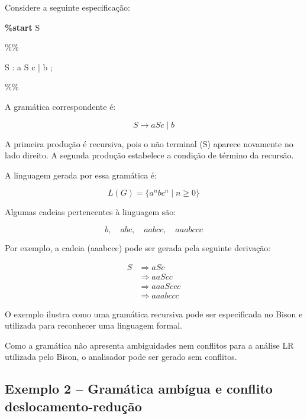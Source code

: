 \documentclass[
  brazilian,
  letterpaper,
]{book}
\newenvironment{Shaded}{\begin{snugshade}}{\end{snugshade}}
\newcommand{\BaseNTok}[1]{\textcolor[rgb]{0.68,0.00,0.00}{#1}}
\newcommand{\CharTok}[1]{\textcolor[rgb]{0.13,0.47,0.30}{#1}}
\newcommand{\KeywordTok}[1]{\textcolor[rgb]{0.00,0.23,0.31}{\textbf{#1}}}
\newcommand{\NormalTok}[1]{\textcolor[rgb]{0.00,0.23,0.31}{#1}}
\newcommand{\StringTok}[1]{\textcolor[rgb]{0.13,0.47,0.30}{#1}}
\theoremstyle{plain}
\theoremstyle{definition}
\theoremstyle{remark}
\begin{document}
Considere a seguinte especificação:

\begin{Shaded}
\begin{Highlighting}[]
\KeywordTok{\%start}\NormalTok{ S}

\BaseNTok{\%\%}

\StringTok{S }\NormalTok{: }\CharTok{\textquotesingle{}a\textquotesingle{}}\NormalTok{ S }\CharTok{\textquotesingle{}c\textquotesingle{}}
\NormalTok{  | }\CharTok{\textquotesingle{}b\textquotesingle{}}
\NormalTok{  ;}

\BaseNTok{\%\%}
\end{Highlighting}
\end{Shaded}

A gramática correspondente é:

\[
S\rightarrow aSc \mid b
\]

A primeira produção é recursiva, pois o não terminal (S) aparece
novamente no lado direito. A segunda produção estabelece a condição de
término da recursão.

A linguagem gerada por essa gramática é:

\[
L(G)=\{a^n b c^n \mid n\geq 0\}
\]

Algumas cadeias pertencentes à linguagem são:

\[
b,\quad abc,\quad aabcc,\quad aaabccc
\]

Por exemplo, a cadeia (aaabccc) pode ser gerada pela seguinte derivação:

\[
\begin{aligned}
S &\Rightarrow aSc\\
  &\Rightarrow aaScc\\
  &\Rightarrow aaaSccc\\
  &\Rightarrow aaabccc
\end{aligned}
\]

O exemplo ilustra como uma gramática recursiva pode ser especificada no
Bison e utilizada para reconhecer uma linguagem formal.

Como a gramática não apresenta ambiguidades nem conflitos para a análise
LR utilizada pelo Bison, o analisador pode ser gerado sem conflitos.

\subsection{Exemplo 2 -- Gramática ambígua e conflito
deslocamento-redução}\label{exemplo-2-gramuxe1tica-ambuxedgua-e-conflito-deslocamento-reduuxe7uxe3o}
\end{document}
